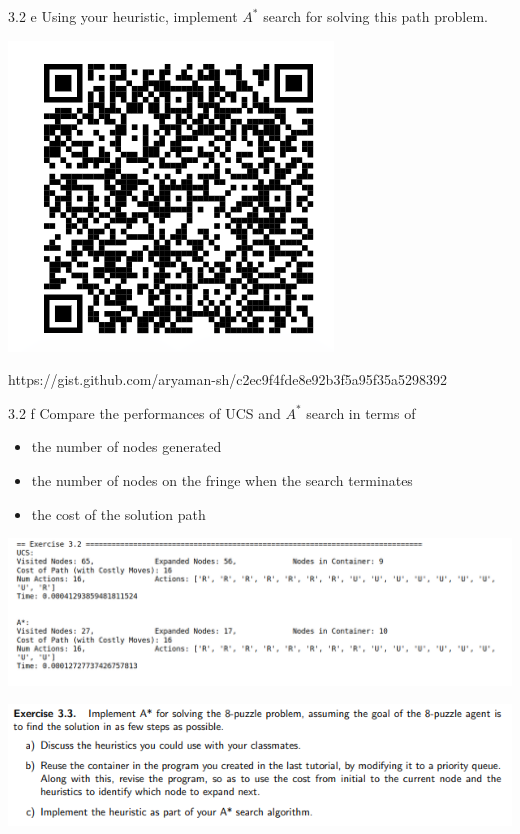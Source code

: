 \documentclass[11pt]{beamer}
\begin{document}
\begin{frame}{3.2 e}
Using your heuristic, implement $A^*$ search for solving this path problem. \pause
\begin{center}
\includegraphics[scale=0.4]{astarcode.png}
\end{center}
https://gist.github.com/aryaman-sh/c2ec9f4fde8e92b3f5a95f35a5298392
\end{frame}

\begin{frame}{3.2 f}
Compare the performances of UCS and $A^*$ search in terms of
\begin{itemize}
	\item the number of nodes generated
	\item the number of nodes on the fringe when the search terminates
	\item the cost of the solution path
\end{itemize}\pause
\includegraphics[scale=0.25]{32answer.png}
\end{frame}

\begin{frame}{3.3}
\includegraphics[scale=0.5]{33ques.png}
\end{frame}
\end{document}
